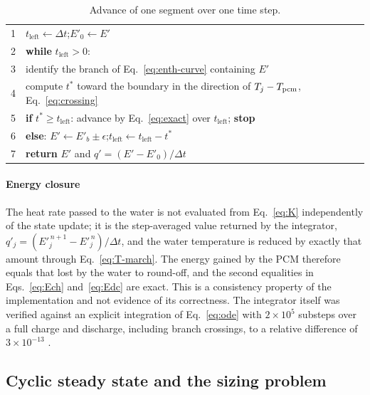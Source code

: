 \begin{table}[htbp]
\centering
\caption{Advance of one segment over one time step.}
\label{tab:alg-segment}
\small
\begin{tabular}{@{}r l@{}}
\toprule
1 & $t_\mathrm{left}\leftarrow\Delta t$;\quad $E'_{0}\leftarrow E'$\\
2 & \textbf{while} $t_\mathrm{left}>0$:\\
3 & \quad identify the branch of Eq.~\eqref{eq:enth-curve} containing $E'$\\
4 & \quad compute $t^{*}$ toward the boundary in the direction of $T_j-T_{\mathrm{pcm}}$, Eq.~\eqref{eq:crossing}\\
5 & \quad \textbf{if} $t^{*}\ge t_\mathrm{left}$: advance by Eq.~\eqref{eq:exact} over $t_\mathrm{left}$; \textbf{stop}\\
6 & \quad \textbf{else}: $E'\leftarrow E'_b\pm\epsilon$;\quad $t_\mathrm{left}\leftarrow t_\mathrm{left}-t^{*}$\\
7 & \textbf{return} $E'$ and $q'=(E'-E'_{0})/\Delta t$\\
\bottomrule
\end{tabular}
\end{table}

\paragraph{Energy closure} The heat rate passed to the water is not evaluated
from Eq.~\eqref{eq:K} independently of the state update; it is the
step-averaged value returned by the integrator,
$q'_j=(E'^{\,n+1}_j-E'^{\,n}_j)/\Delta t$, and the water temperature is reduced
by exactly that amount through Eq.~\eqref{eq:T-march}. The energy gained by
the PCM therefore equals that lost by the water to round-off, and the second
equalities in Eqs.~\eqref{eq:Ech} and~\eqref{eq:Edc} are exact. This is a
consistency property of the implementation and not evidence of its
correctness. The integrator itself was verified against an explicit
integration of Eq.~\eqref{eq:ode} with $2\times10^{5}$ substeps over a full
charge and discharge, including branch crossings, to a relative difference of
$3\times10^{-13}$ .

\subsection{Cyclic steady state and the sizing problem}
\label{sec:css}


